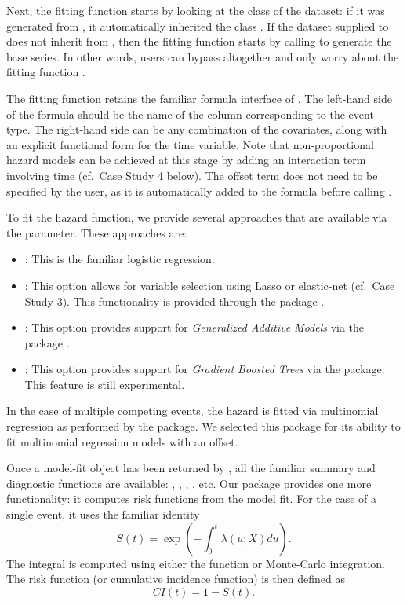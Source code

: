 \documentclass[
]{jss}
\providecommand{\tightlist}{%
  \setlength{\itemsep}{0pt}\setlength{\parskip}{0pt}}
\begin{document}
Next, the fitting function  starts by looking at
the class of the dataset: if it was generated from
, it automatically inherited the class
. If the dataset supplied to  does
not inherit from , then the fitting function starts by
calling  to generate the base series. In other
words, users can bypass  altogether and only worry
about the fitting function .

The fitting function retains the familiar formula interface of
. The left-hand side of the formula should be the name of the
column corresponding to the event type. The right-hand side can be any
combination of the covariates, along with an explicit functional form
for the time variable. Note that non-proportional hazard models can be
achieved at this stage by adding an interaction term involving time
(cf.~Case Study 4 below). The offset term does not need to be specified
by the user, as it is automatically added to the formula before calling
.

To fit the hazard function, we provide several approaches that are
available via the  parameter. These approaches are:

\begin{itemize}
\tightlist
\item
  : This is the familiar logistic regression.
\item
  : This option allows for variable selection using Lasso
  or elastic-net (cf.~Case Study 3). This functionality is provided
  through the  package \citep{friedman2010jss}.
\item
  : This option provides support for \emph{Generalized
  Additive Models} via the  package
  \citep{hastie1987generalized}.
\item
  : This option provides support for \emph{Gradient Boosted
  Trees} via the  package. This feature is still experimental.
\end{itemize}

In the case of multiple competing events, the hazard is fitted via
multinomial regression as performed by the  package. We
selected this package for its ability to fit multinomial regression
models with an offset.

Once a model-fit object has been returned by , all
the familiar summary and diagnostic functions are available:
, , , , etc. Our
package provides one more functionality: it computes risk functions from
the model fit. For the case of a single event, it uses the familiar
identity \begin{equation}\label{eqn:surv}
S(t) = \exp\left(-\int_0^t \lambda(u;X) du\right).
\end{equation} The integral is computed using either the
 function or Monte-Carlo integration. The risk
function (or cumulative incidence function) is then defined as
\begin{equation}\label{eqn:CI}
CI(t) = 1 - S(t).
\end{equation}
\end{document}
